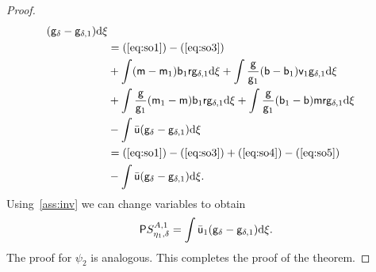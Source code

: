 \begin{proof}
\begin{equation}
\begin{split}
      (\mathsf{g}_\delta - \mathsf{g}_{\delta,1})\mathrm{d}\xi \\
    & =(\ref{eq:so1}) - (\ref{eq:so3})                                                  \\
    & +
      \int(\mathsf{m}-\mathsf{m}_1)\mathsf{b}_1\mathsf{r}\mathsf{g}_{\delta,1}\mathrm{d}\xi +
      \int\frac{\mathsf{g}}{\mathsf{g}_1}(\mathsf{b}-\mathsf{b}_1)\mathsf{v}_1\mathsf{g}_{\delta,1}\mathrm{d}\xi            \\
    & +\int
      \frac{\mathsf{g}}{\mathsf{g}_1}(\mathsf{m}_1
      -\mathsf{m})\mathsf{b}_1\mathsf{r}\mathsf{g}_{\delta,1}\mathrm{d}\xi
      +\int
      \frac{\mathsf{g}}{\mathsf{g}_1}(\mathsf{b}_1-\mathsf{b})\mathsf{m}\mathsf{r}\mathsf{g}_{\delta,1}\mathrm{d}\xi                 \\
    & - \int\bar{\mathsf{u}}
      (\mathsf{g}_\delta - \mathsf{g}_{\delta,1})\mathrm{d}\xi \\
    & =(\ref{eq:so1})-(\ref{eq:so3}) +(\ref{eq:so4})-(\ref{eq:so5}) \\
    & - \int\bar{\mathsf{u}}(\mathsf{g}_\delta - \mathsf{g}_{\delta,1})\mathrm{d}\xi.
  \end{split}\label{eq:proof1}
\end{equation}
Using~\ref{ass:inv} we can change variables to obtain
\[\mathsf{P} S_{\eta_1,\delta}^{A,1} =
  \int\bar{\mathsf{u}}_1(\mathsf{g}_\delta-\mathsf{g}_{\delta,1})\mathrm{d}\xi.\] The proof for
$\psi_2$ is analogous. This completes the
proof of the theorem.
\end{proof}

